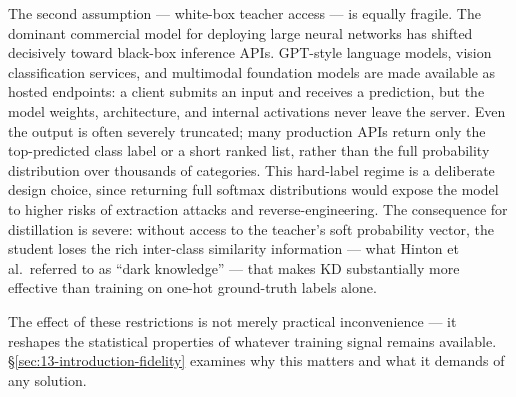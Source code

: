 \begin{foldable}
  The second assumption --- white-box teacher access --- is equally fragile.
  The dominant commercial model for deploying large neural networks has shifted decisively toward black-box inference \ac{API}{}s.
  GPT-style language models, vision classification services, and multimodal foundation models are made available as hosted endpoints: a client submits an input and receives a prediction, but the model weights, architecture, and internal activations never leave the server.
  Even the output is often severely truncated; many production \ac{API}{}s return only the top-predicted class label or a short ranked list, rather than the full probability distribution over thousands of categories.
  This hard-label regime is a deliberate design choice, since returning full softmax distributions would expose the model to higher risks of extraction attacks and reverse-engineering.
  The consequence for distillation is severe: without access to the teacher's soft probability vector, the student loses the rich inter-class similarity information --- what Hinton et al.\ referred to as ``dark knowledge'' --- that makes \ac{KD} substantially more effective than training on one-hot ground-truth labels alone.
\end{foldable}

\begin{foldable}
  The effect of these restrictions is not merely practical inconvenience --- it reshapes the statistical properties of whatever training signal remains available.
  \S\ref{sec:13-introduction-fidelity} examines why this matters and what it demands of any solution.
\end{foldable}
